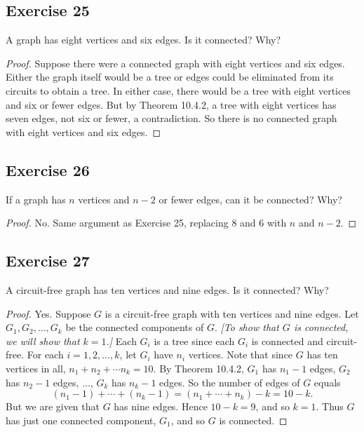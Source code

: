 \documentclass[14pt]{extarticle}
\begin{document}
\subsection{Exercise 25}
A graph has eight vertices and six edges. Is it connected? Why?

\begin{proof}
Suppose there were a connected graph with eight vertices and six edges. Either the graph itself would be a tree or edges 
could be eliminated from its circuits to obtain a tree. In either case, there would be a tree with eight vertices and six 
or fewer edges. But by Theorem 10.4.2, a tree with eight vertices has seven edges, not six or fewer, a contradiction. 
So there is no connected graph with eight vertices and six edges.
\end{proof}

\subsection{Exercise 26}
If a graph has \(n\) vertices and \(n - 2\) or fewer edges, can it be connected? Why?

\begin{proof}
No. Same argument as Exercise 25, replacing 8 and 6 with \(n\) and \(n-2\).
\end{proof}

\subsection{Exercise 27}
A circuit-free graph has ten vertices and nine edges. Is it connected? Why?

\begin{proof}
Yes. Suppose \(G\) is a circuit-free graph with ten vertices and nine edges. Let \(G_1, G_2, \ldots, G_k\) be the connected 
components of \(G\). {\it [To show that \(G\) is connected, we will show that \(k = 1\).]} Each \(G_i\) is a tree since each 
\(G_i\) is connected and circuit-free. For each \(i = 1, 2, \ldots, k\), let \(G_i\) have \(n_i\) vertices. Note that 
since \(G\) has ten vertices in all, \(n_1 + n_2 + \cdots n_k = 10\). By Theorem 10.4.2, \(G_1\) has \(n_1 - 1\) edges, 
\(G_2\) has \(n_2 - 1\) edges, \(\ldots\), \(G_k\) has \(n_k - 1\) edges. So the number of edges of \(G\) equals
\[
(n_1 - 1) + \cdots + (n_k - 1) = (n_1 + \cdots + n_k) - k = 10-k.
\]
But we are given that \(G\) has nine edges. Hence \(10 - k = 9\), and so \(k = 1\). Thus \(G\) has just one connected 
component, \(G_1\), and so \(G\) is connected.
\end{proof}
\end{document}
